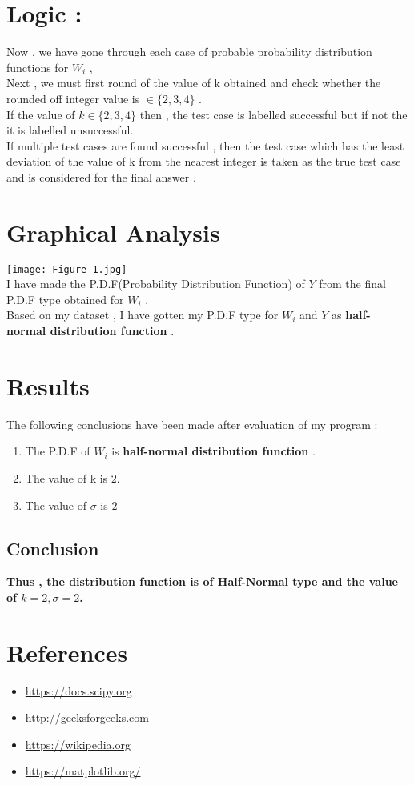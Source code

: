 \documentclass{article}
\begin{document}
\section*{Logic :}
Now , we have gone through each case of probable probability distribution functions for $W_i$ ,
\vspace{5pt}
\\Next , we must first round of the value of k obtained and check whether the rounded off integer value is $\in \{2,3,4\}$ . 
\vspace{5pt}
\\If the value of $ k\in \{2,3,4\}$ then , the test case is labelled {\color{green}successful} but if not the it is labelled {\color{red}unsuccessful}.
\vspace{5pt}
\\If multiple test cases are found successful , then the test case which has the least deviation of the value of k from the nearest integer is taken as the true test case
and is considered for the final answer .
\newpage
\section{Graphical Analysis} 
\vspace{10pt}
\texttt{[image: Figure 1.jpg]}
\vspace{5pt}
\\I have made the P.D.F(Probability Distribution Function) of $Y$ from the final P.D.F type obtained for $W_i$ .
\vspace{5pt}
\\Based on my dataset , I have gotten my P.D.F type for $W_i$ and $Y$ as \textbf{half-normal distribution function} .
\vspace{20pt}
\newpage
\section{Results}
\vspace{20pt}
The following conclusions have been made after evaluation of my program : 
\begin{enumerate}
    \item The P.D.F of $W_i$ is \textbf{half-normal distribution function} .
    \item The value of k is $2$.
    \item The value of $\sigma$ is $2$
\end{enumerate}
\vspace{20pt}
\subsection*{Conclusion}
\textbf{Thus , the distribution function is of Half-Normal type and the value of $k=2,\sigma=2$.}
\newpage
\section{References}
\vspace{30pt}
\begin{itemize}
    \item \url{https://docs.scipy.org}
    \item \url{http://geeksforgeeks.com}
    \item \url{https://wikipedia.org}
    \item \url{https://matplotlib.org/}
\end{itemize}
\end{document}
